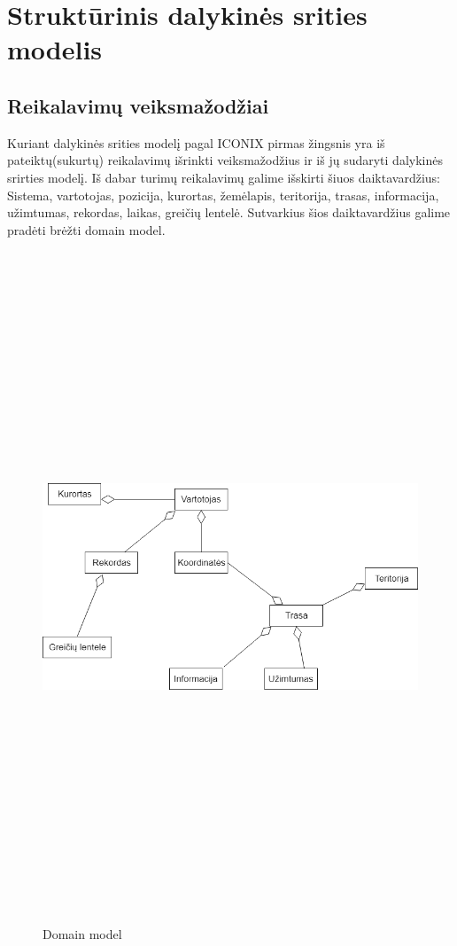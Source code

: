 \documentclass[oneside]{VUMIFPSkursinis}
\begin{document}
\section{Struktūrinis dalykinės srities modelis}
\subsection{Reikalavimų veiksmažodžiai}
	Kuriant dalykinės srities modelį pagal ICONIX pirmas žingsnis yra iš pateiktų(sukurtų) reikalavimų išrinkti veiksmažodžius ir iš jų sudaryti dalykinės srirties modelį. Iš  dabar turimų reikalavimų galime išskirti šiuos daiktavardžius:
	\newline
	\newline
	Sistema, vartotojas,  pozicija, kurortas, žemėlapis, teritorija, trasas, informacija, užimtumas, rekordas, laikas, greičių lentelė. 
	\newline
	\newline
	Sutvarkius šios daiktavardžius galime pradėti brėžti domain model. 
\begin{figure}[H]
		\centering	
	\includegraphics[width=18cm,height=20cm,keepaspectratio]{DomainModel.png}
	\caption{Domain model}
	\label{fig:Domain model}
\end{figure}
\end{document}
